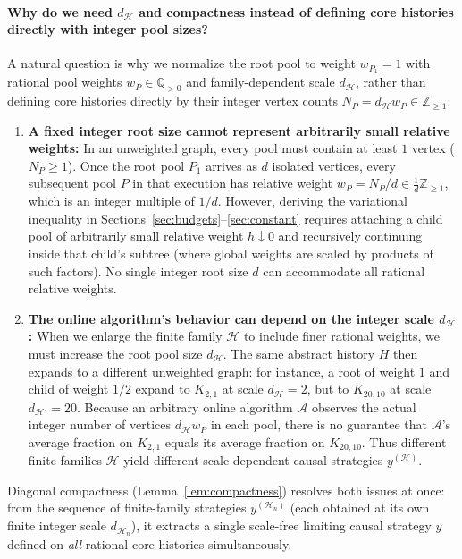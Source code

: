 \documentclass[11pt,letterpaper]{article}
\begin{document}
\paragraph{Why do we need $d_{\mathcal H}$ and compactness instead of defining core histories directly with integer pool sizes?}
A natural question is why we normalize the root pool to weight $w_{P_1}=1$ with rational pool weights $w_P\in\mathbb Q_{>0}$ and family-dependent scale $d_{\mathcal H}$, rather than defining core histories directly by their integer vertex counts $N_P = d_{\mathcal H} w_P\in\mathbb Z_{\ge 1}$:
\begin{enumerate}
\item \textbf{A fixed integer root size cannot represent arbitrarily small relative weights:} In an unweighted graph, every pool must contain at least $1$ vertex ($N_P\ge 1$). Once the root pool $P_1$ arrives as $d$ isolated vertices, every subsequent pool $P$ in that execution has relative weight $w_P = N_P/d \in \frac{1}{d}\mathbb Z_{\ge 1}$, which is an integer multiple of $1/d$. However, deriving the variational inequality in Sections~\ref{sec:budgets}--\ref{sec:constant} requires attaching a child pool of arbitrarily small relative weight $h\downarrow 0$ and recursively continuing inside that child's subtree (where global weights are scaled by products of such factors). No single integer root size $d$ can accommodate all rational relative weights.
\item \textbf{The online algorithm's behavior can depend on the integer scale $d_{\mathcal H}$:} When we enlarge the finite family $\mathcal H$ to include finer rational weights, we must increase the root pool size $d_{\mathcal H}$. The same abstract history $H$ then expands to a different unweighted graph: for instance, a root of weight $1$ and child of weight $1/2$ expand to $K_{2,1}$ at scale $d_{\mathcal H}=2$, but to $K_{20,10}$ at scale $d_{\mathcal H'}=20$. Because an arbitrary online algorithm $\mathcal A$ observes the actual integer number of vertices $d_{\mathcal H} w_P$ in each pool, there is no guarantee that $\mathcal A$'s average fraction on $K_{2,1}$ equals its average fraction on $K_{20,10}$. Thus different finite families $\mathcal H$ yield different scale-dependent causal strategies $y^{(\mathcal H)}$.
\end{enumerate}
Diagonal compactness (Lemma~\ref{lem:compactness}) resolves both issues at once: from the sequence of finite-family strategies $y^{(\mathcal H_n)}$ (each obtained at its own finite integer scale $d_{\mathcal H_n}$), it extracts a single scale-free limiting causal strategy $y$ defined on \emph{all} rational core histories simultaneously.
\end{document}
